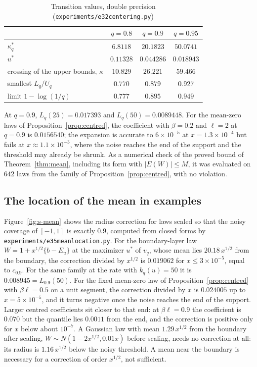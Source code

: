 \documentclass[11pt]{article}
\renewcommand{\_}{\usc\allowbreak}
\begin{document}
\begin{table}[h]
\centering
\caption{Transition values, double precision (\texttt{experiments/e32\_centering.py})}
\label{tab:s-transition}
\begin{tabular}{lccc}
\toprule
 & $q = 0.8$ & $q = 0.9$ & $q = 0.95$ \\
\midrule
$\kappa^*_q$ & $6.8118$ & $20.1823$ & $50.0741$ \\
$u^*$ & $0.11328$ & $0.044286$ & $0.018943$ \\
crossing of the upper bounds, $\kappa$ & $10.829$ & $26.221$ & $59.466$ \\
smallest $L_q/U_q$ & $0.770$ & $0.879$ & $0.927$ \\
limit $1 - \log(1/q)$ & $0.777$ & $0.895$ & $0.949$ \\
\bottomrule
\end{tabular}
\end{table}

At $q = 0.9$, $L_q(25) = 0.017393$ and $L_q(50) = 0.0089448$. For the mean-zero laws of Proposition~\ref{prop:centred}, the coefficient with $\beta = 0.2$ and $\ell = 2$ at $q = 0.9$ is $0.0156540$; the expansion is accurate to $6\times10^{-5}$ at $x = 1.3\times10^{-4}$ but fails at $x \approx 1.1\times10^{-3}$, where the noise reaches the end of the support and the threshold may already be shrunk. As a numerical check of the proved bound of Theorem~\ref{thm:mean}, including its form with $|E(W)| \le M$, it was evaluated on $642$ laws from the family of Proposition~\ref{prop:centred}, with no violation.

\subsection*{The location of the mean in examples}

Figure~\ref{fig:s-mean} shows the radius correction for laws scaled so that the noisy coverage of $[-1, 1]$ is exactly $0.9$, computed from closed forms by \texttt{experiments/e35\_mean\_location.py}. For the boundary-layer law $W = 1 + x^{1/2}\{b - E_u\}$ at the maximizer $u^*$ of $v_q$, whose mean lies $20.18\,x^{1/2}$ from the boundary, the correction divided by $x^{1/2}$ is $0.019062$ for $x \le 3\times10^{-5}$, equal to $c_{0.9}$. For the same family at the rate with $k_q(u) = 50$ it is $0.008945 = L_{0.9}(50)$. For the fixed mean-zero law of Proposition~\ref{prop:centred} with $\beta\ell = 0.5$ on a unit segment, the correction divided by $x$ is $0.024005$ up to $x = 5\times10^{-5}$, and it turns negative once the noise reaches the end of the support. Larger centred coefficients sit closer to that end: at $\beta\ell = 0.9$ the coefficient is $0.070$ but the quantile lies $0.0011$ from the end, and the correction is positive only for $x$ below about $10^{-7}$. A Gaussian law with mean $1.29\,x^{1/2}$ from the boundary after scaling, $W \sim N(1 - 2x^{1/2}, 0.01x)$ before scaling, needs no correction at all: its radius is $1.16\,x^{1/2}$ below the noisy threshold. A mean near the boundary is necessary for a correction of order $x^{1/2}$, not sufficient.
\end{document}
